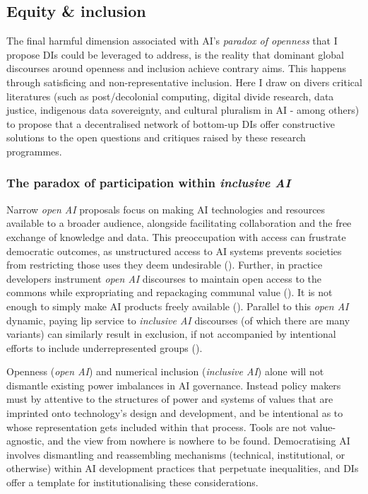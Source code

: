 \subsection*{Equity \& inclusion}

The final harmful dimension associated with AI's \textit{paradox of openness} that I propose DIs could be leveraged to address, is the reality that dominant global discourses around openness and inclusion achieve contrary aims. This happens through satisficing and non-representative inclusion. Here I draw on divers critical literatures (such as post/decolonial computing, digital divide research, data justice, indigenous data sovereignty, and cultural pluralism in AI - among others) to propose that a decentralised network of bottom-up DIs offer constructive solutions to the open questions and critiques raised by these research programmes. 

\subsubsection*{The paradox of participation within \textit{inclusive AI}}

Narrow \textit{open AI} proposals focus on making AI technologies and resources available to a broader audience, alongside facilitating collaboration and the free exchange of knowledge and data. This preoccupation with access can frustrate democratic outcomes, as unstructured access to AI systems prevents societies from restricting those uses they deem undesirable (\cite{chan2023ReclaimingDigitalCommons}). Further, in practice developers instrument \textit{open AI} discourses to maintain open access to the commons while expropriating and repackaging communal value (\cite{graywidder2023OpenBusinessBiga}). It is not enough to simply make AI products freely available (\cite{PoliciesDigitalCommons}). Parallel to this \textit{open AI} dynamic, paying lip service to \textit{inclusive AI} discourses (of which there are many variants) can similarly result in exclusion, if not accompanied by intentional efforts to include underrepresented groups (\cite{png2022TensionsSouthNorth}).

Openness (\textit{open AI}) and numerical inclusion (\textit{inclusive AI}) alone will not dismantle existing power imbalances in AI governance. Instead policy makers must by attentive to the structures of power and systems of values that are imprinted onto technology’s design and development, and be intentional as to whose representation gets included within that process. Tools are not value-agnostic, and the view from nowhere is nowhere to be found. Democratising AI involves dismantling and reassembling mechanisms (technical, institutional, or otherwise) within AI development practices that perpetuate inequalities, and DIs offer a template for institutionalising these considerations.

